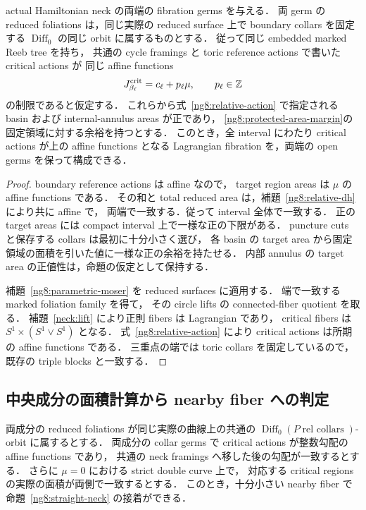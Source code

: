 \begin{proposition}
\label{ng8:straight-neck}
actual Hamiltonian neck の両端の fibration germs を与える．
両 germ の reduced foliations は，同じ実際の reduced surface 上で
boundary collars を固定する $\operatorname{Diff}_0$ の同じ orbit に属するものとする．
従って同じ embedded marked Reeb tree を持ち，
共通の cycle framings と toric reference actions で書いた critical actions が
同じ affine functions
\[
 J_{\beta_\ell}^{\rm crit}=c_\ell+p_\ell\mu,\qquad p_\ell\in\mathbb Z
\]
の制限であると仮定する．
これらから式~\eqref{ng8:relative-action} で指定される
basin および internal-annulus areas が正であり，
\eqref{ng8:protected-area-margin}の固定領域に対する余裕を持つとする．
このとき，全 interval にわたり critical actions が上の affine functions となる
Lagrangian fibration を，両端の open germs を保って構成できる．
\end{proposition}

\begin{proof}
boundary reference actions は affine なので，
target region areas は $\mu$ の affine functions である．
その和と total reduced area は，補題~\ref{ng8:relative-dh} により共に affine で，
両端で一致する．従って interval 全体で一致する．
正の target areas には compact interval 上で一様な正の下限がある．
puncture cuts と保存する collars は最初に十分小さく選び，
各 basin の target area から固定領域の面積を引いた値に一様な正の余裕を持たせる．
内部 annulus の target area の正値性は，命題の仮定として保持する．

補題~\ref{ng8:parametric-moser} を reduced surfaces に適用する．
端で一致する marked foliation family を得て，
その circle lifts の connected-fiber quotient を取る．
補題~\ref{neck:lift} により正則 fibers は Lagrangian であり，
critical fibers は $S^1\times(S^1\vee S^1)$ となる．
式~\eqref{ng8:relative-action} により critical actions は所期の affine functions である．
三重点の端では toric collars を固定しているので，既存の triple blocks と一致する．
\end{proof}

\subsection{中央成分の面積計算から nearby fiber への判定}

\begin{corollary}
\label{ng8:central-criterion}
両成分の reduced foliations が同じ実際の曲線上の共通の
$\operatorname{Diff}_0(P\operatorname{ rel\ collars})$-orbit に属するとする．
両成分の collar germs で critical actions が整数勾配の affine functions であり，
共通の neck framings へ移した後の勾配が一致するとする．
さらに $\mu=0$ における strict double curve 上で，
対応する critical regions の実際の面積が両側で一致するとする．
このとき，十分小さい nearby fiber で命題~\ref{ng8:straight-neck} の接着ができる．
\end{corollary}

